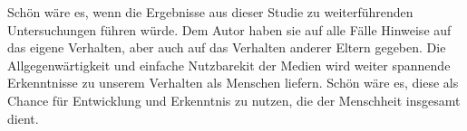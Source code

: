 Schön wäre es, wenn die Ergebnisse aus dieser Studie zu weiterführenden Untersuchungen führen würde. Dem Autor haben sie auf alle Fälle Hinweise auf das eigene Verhalten, aber auch auf das Verhalten anderer Eltern gegeben. Die Allgegenwärtigkeit und einfache Nutzbarekit der Medien wird weiter spannende Erkenntnisse zu unserem Verhalten als Menschen liefern. Schön wäre es, diese als Chance für Entwicklung und Erkenntnis zu nutzen, die der Menschheit insgesamt dient.

\newpage